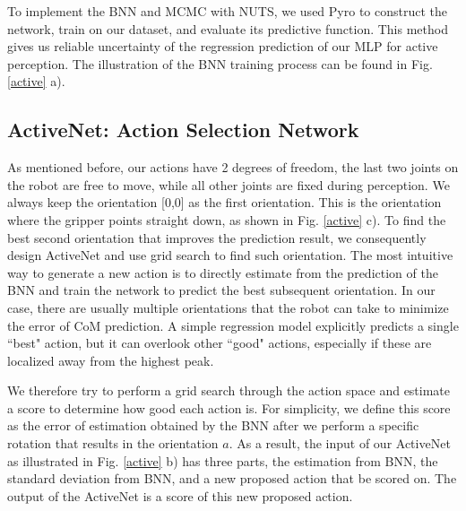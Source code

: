 To implement the BNN and MCMC with NUTS, we used Pyro \cite{pyro} to construct the network, train on our dataset, and evaluate its predictive function. This method gives us reliable uncertainty of the regression prediction of our MLP for active perception. The illustration of the BNN training process can be found in Fig. \ref{active} a).

\subsection{ActiveNet: Action Selection Network}
As mentioned before, our actions have 2 degrees of freedom, the last two joints on the robot are free to move, while all other joints are fixed during perception.
We always keep the orientation [0,0] as the first orientation. This is the orientation where the gripper points straight down, as shown in Fig. \ref{active} c).
To find the best second orientation that improves the prediction result, we consequently design ActiveNet and use grid search to find such orientation. The most intuitive way to generate a new action is to directly estimate from the prediction of the BNN and train the network to predict the best subsequent orientation. In our case, there are usually multiple orientations that the robot can take to minimize the error of CoM prediction. A simple regression model explicitly predicts a single ``best" action, but it can overlook other ``good" actions, especially if these are localized away from the highest peak. 

We therefore try to perform a grid search through the action space and estimate a score to determine how good each action is. For simplicity, we define this score as the error of estimation obtained by the BNN after we perform a specific rotation that results in the orientation $a$. 
As a result, the input of our ActiveNet as illustrated in Fig. \ref{active} b) has three parts, the estimation from BNN, the standard deviation from BNN, and a new proposed action that be scored on. 
The output of the ActiveNet is a score of this new proposed action. %

